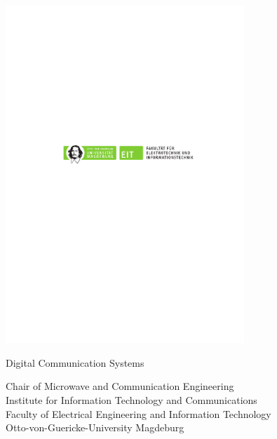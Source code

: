 %
%
%

\begin{titlepage}
	\begin{center}
		\normalsize

		\vspace*{1cm}
	
		\includegraphics[width=9cm]{../common/EIT_SIGN_ovgu}
		
		\vspace{1.5cm}
	
		\Huge
		Digital Communication Systems
		
		\vspace{0.75cm}
		
		\ifdefined\thesubtitle
		\Large
		\thesubtitle
		
		\vspace{0.75cm}
		\par
		\fi
		
		\normalsize
		\textbf{\thekindofdocument}
		
		\vspace{1.5cm}
		
		\normalsize
		Chair of Microwave and Communication Engineering \\
		Institute for Information Technology and Communications \\
		Faculty of Electrical Engineering and Information Technology \\
		Otto-von-Guericke-University Magdeburg
		

\end{center}
\end{titlepage}

